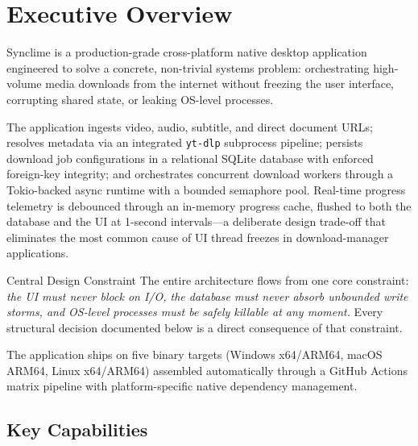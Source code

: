 \documentclass[10pt,letterpaper]{article}
\begin{document}
\section{Executive Overview}

Synclime is a production-grade cross-platform native desktop application engineered to solve
a concrete, non-trivial systems problem: orchestrating high-volume media downloads from
the internet without freezing the user interface, corrupting shared state, or leaking
OS-level processes.

The application ingests video, audio, subtitle, and direct document URLs; resolves metadata
via an integrated \texttt{yt-dlp} subprocess pipeline; persists download job configurations
in a relational SQLite database with enforced foreign-key integrity; and orchestrates
concurrent download workers through a Tokio-backed async runtime with a bounded semaphore
pool. Real-time progress telemetry is debounced through an in-memory progress cache, flushed
to both the database and the UI at 1-second intervals---a deliberate design trade-off that
eliminates the most common cause of UI thread freezes in download-manager applications.

\begin{insightbox}{Central Design Constraint}
The entire architecture flows from one core constraint: \emph{the UI must never block on I/O,
the database must never absorb unbounded write storms, and OS-level processes must be safely
killable at any moment.} Every structural decision documented below is a direct consequence
of that constraint.
\end{insightbox}

The application ships on five binary targets (Windows x64/ARM64, macOS ARM64, Linux
x64/ARM64) assembled automatically through a GitHub Actions matrix pipeline with
platform-specific native dependency management.

\subsection{Key Capabilities}
\end{document}
